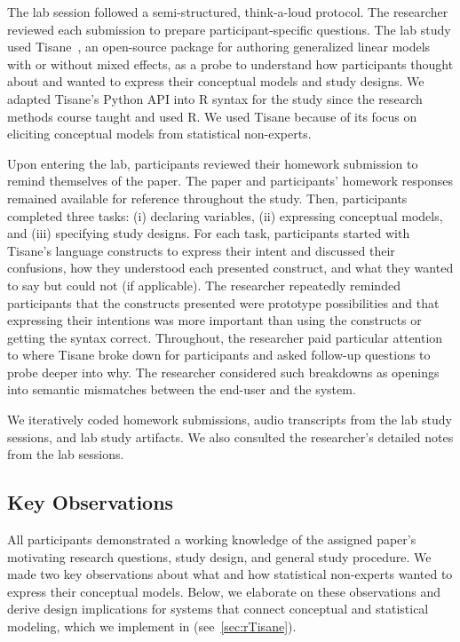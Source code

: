 The lab session followed a semi-structured, think-a-loud protocol. The
researcher reviewed each submission to prepare participant-specific questions.
The lab study used Tisane~\cite{jun2022tisane}, an open-source package for
authoring generalized linear models with or without mixed effects, as a probe to
understand how participants thought about and wanted to express their conceptual
models and study designs. We adapted Tisane's Python API into R syntax for the
study since the research methods course taught and used R. We used Tisane
because of its focus on eliciting conceptual models from statistical
non-experts. 

Upon entering the lab, participants reviewed their homework submission to remind
themselves of the paper. The paper and participants' homework responses remained
available for reference throughout the study. Then, participants completed three
tasks: (i) declaring variables, (ii) expressing conceptual models, and (iii)
specifying study designs. For each task, participants started with Tisane's
language constructs to express their intent and discussed their confusions, how
they understood each presented construct, and what they wanted to say but could
not (if applicable). The researcher repeatedly reminded participants that the
constructs presented were prototype possibilities and that expressing their
intentions was more important than using the constructs or getting the syntax
correct. Throughout, the researcher paid particular attention to where Tisane
broke down for participants and asked follow-up questions to probe deeper into
why. The researcher considered such breakdowns as openings into semantic
mismatches between the end-user and the system. 

We iteratively coded homework submissions, audio transcripts from the lab study
sessions, and lab study artifacts. We also consulted the
researcher's detailed notes from the lab sessions. 


\subsection{Key Observations}
All participants demonstrated a working knowledge of the assigned paper's
motivating research questions, study design, and general study procedure. 
We made two key observations about what and how statistical non-experts wanted
to express their conceptual models. Below, we elaborate on these observations
and derive design implications for systems that connect conceptual and
statistical modeling, which we implement in \rTisane (see~\autoref{sec:rTisane}).

